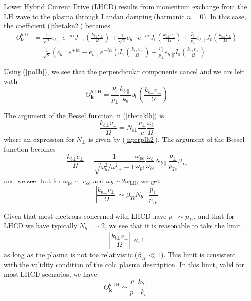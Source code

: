 Lower Hybrid Current Drive (LHCD) results from momentum exchange from the LH
wave to the plasma through Landau damping (harmonic $n=0$). In this case, the
coefficient (\ref{thetakn2}) becomes
\begin{align}
\Theta_{\mathbf{k}}^{b,0}  &  =\frac{1}{\sqrt{2}}e_{b,+}e^{-i\alpha}%
J_{-1}\left(  \frac{k_{b\bot}v_{\bot}}{\Omega}\right)  +\frac{1}{\sqrt{2}%
}e_{b,-}e^{+i\alpha}J_{1}\left(  \frac{k_{b\bot}v_{\bot}}{\Omega}\right)
+\frac{p_{\Vert}}{p_{\bot}}e_{b,\Vert}J_{0}\left(  \frac{k_{b\bot}v_{\bot}%
}{\Omega}\right) \\
&  =\frac{1}{\sqrt{2}}\left(  e_{b,-}e^{+i\alpha}-e_{b,+}e^{-i\alpha}\right)
J_{1}\left(  \frac{k_{b\bot}v_{\bot}}{\Omega}\right)  +\frac{p_{\Vert}%
}{p_{\bot}}e_{b,\Vert}J_{0}\left(  \frac{k_{b\bot}v_{\bot}}{\Omega}\right)
\end{align}

Using (\ref{pollh}), we see that the perpendicular components cancel and we
are left with
\begin{equation}
\Theta_{\mathbf{k}}^{b,\text{LH}}=\frac{p_{\Vert}}{p_{\bot}}\frac
{k_{b\parallel}}{k_{b}}J_{0}\left(  \frac{k_{b\bot}v_{\bot}}{\Omega}\right)
\label{thetaklh}%
\end{equation}

The argument of the Bessel function in (\ref{thetaklh}) is
\begin{equation}
\frac{k_{b\bot}v_{\bot}}{\Omega}=N_{b\bot}\frac{v_{\bot}}{c}\frac{\omega_{b}%
}{\Omega}%
\end{equation}
where an expression for $N_{\bot}$ is given by (\ref{nperplh2}). The argument
of the Bessel function becomes
\begin{equation}
\frac{k_{b\bot}v_{\bot}}{\Omega}=\frac{1}{\sqrt{\omega_{b}^{2}/\omega
_{\text{LH}}^{2}-1}}\frac{\omega_{pe}}{\omega_{pi}}\frac{\omega_{b}}%
{\omega_{ce}}N_{b\parallel}\frac{p_{\bot}}{p_{Te}}\beta_{Te}%
\end{equation}
and we see that for $\omega_{pe}\sim\omega_{ce}$ and $\omega_{b}\sim
2\omega_{\text{LH}}$, we get
\begin{equation}
\left|  \frac{k_{b\bot}v_{\bot}}{\Omega}\right|  \sim\beta_{Te}N_{b\parallel
}\frac{p_{\bot}}{p_{Te}}%
\end{equation}

Given that most electrons concerned with LHCD have $p_{\bot}\sim p_{Te}$, and
that for LHCD we have typically $N_{b\parallel}\sim2$, we see that it is
reasonable to take the limit
\begin{equation}
\left|  \frac{k_{b\bot}v_{\bot}}{\Omega}\right|  \ll1
\end{equation}
as long as the plasma is not too relativistic ($\beta_{Te}\ll1$). This limit
is consistent with the validity condition of the cold plasma description. In
this limit, valid for most LHCD scenarios, we have
\begin{equation}
\Theta_{\mathbf{k}}^{b,\text{LH}}\simeq\frac{p_{\Vert}}{p_{\bot}}%
\frac{k_{b\parallel}}{k_{b}} \label{thetaklh2}%
\end{equation}

